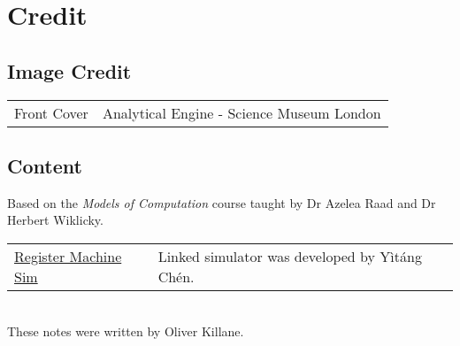 \chapter{Credit}
\section*{Image Credit}
\begin{center}
	\begin{tabular}{r p{}}
        Front Cover & Analytical Engine - Science Museum London \\
	\end{tabular}
\end{center}

\section*{Content}
Based on the \textit{Models of Computation} course taught by Dr Azelea Raad and Dr Herbert Wiklicky.

\begin{center}
	\begin{tabular}{l p{}}
		\href{https://github.com/MMZK1526/Haskell-RM}{Register Machine Sim} & Linked simulator was developed by Yìtáng Chén. \\
	\end{tabular}
\end{center}
\noindent
\vspace{2mm}
\\ These notes were written by Oliver Killane.
